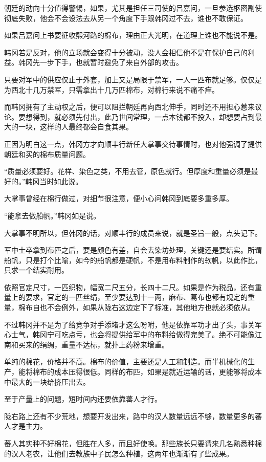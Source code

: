 朝廷的动向十分值得警惕，如果，尤其是担任三司使的吕嘉问，一旦参选枢密副使彻底失败，他会不会设法去从另一个角度下手跟韩冈过不去，谁也不敢保证。

如果吕嘉问上书要征收熙河路的棉布，理由正大光明，在道理上谁也不能说不是。

韩冈若是反对，他的立场就会变得十分被动，没人会相信他不是在保护自己的利益。韩冈先一步下手，也就暂时避免了来自外部的攻击。

只要对军中的供应仅止于外套，加上又是局限于禁军，一人一匹布就足够。仅仅是为西北十几万禁军，只需拿出十几万匹棉布，对棉行来说不痛不痒。

而韩冈拥有了主动权之后，便可以阻拦朝廷再向西北伸手，同时还不用担心惹来议论。要想得到，就必须先付出，此乃世间常理，一点本钱都不投入，却想要占到最大的一块，这样的人最终都会自食其果。

正因为明白这一点，韩冈方才向顺丰行新任大掌事交待事情时，也对他强调了提供朝廷和买的棉布质量问题。

“质量必须要好。花样、染色之类，不用去管，原色就行。但厚度和重量必须是最好的。”韩冈当时如此说。

大掌事曾经在棉行做过，对细节很注意，便小心问韩冈到底要多重多厚。

“能拿去做船帆。”韩冈如是说。

大掌事不明所以，但韩冈的话，对顺丰行的成员来说，就是圣旨一般，点头记下。

军中士卒拿到布匹之后，要是颜色有差，自会去染坊处理，关键还是要结实。所谓船帆，只是打个比喻，如今的船帆都是硬帆，不是用布料制作的软帆，以此作比，只求一个结实耐用。

依照官定尺寸，一匹织物，幅宽二尺五分，长四十二尺。如果是作为税品，还有重量上的要求，官定的一匹丝绢，至少要达到十一两，麻布、葛布也都有规定的重量，棉布自也不会例外，如果从陇右这边定下了标准，其他地方也就必须依从。

不过韩冈并不是为了给竞争对手添堵才这么吩咐，他是依靠军功才出了头，事关军心士气，韩冈宁可吃点亏，也会将提供给军中的布料给做得完美了。绝不可能像江南和买来的绢绸，重量不达标，就扑上药粉来增重。

单纯的棉花，价格并不高。棉布的价值，主要还是人工和制造。而半机械化的生产，能将棉布的成本压得很低。同样的布匹，如果是就近运输的话，更能够将成本中最大的一块给挤压出去。

至于产量上的问题，短时间内还要依靠蕃人才行。

陇右路上还有不少荒地，想要开发出来，路中的汉人数量远远不够，数量更多的蕃人才是主力。

蕃人其实种不好棉花，但胜在人多，而且好使唤。那些族长只要请来几名熟悉种棉的汉人老农，让他们去教族中子民怎么种植，这两年也渐渐有了些成果。


